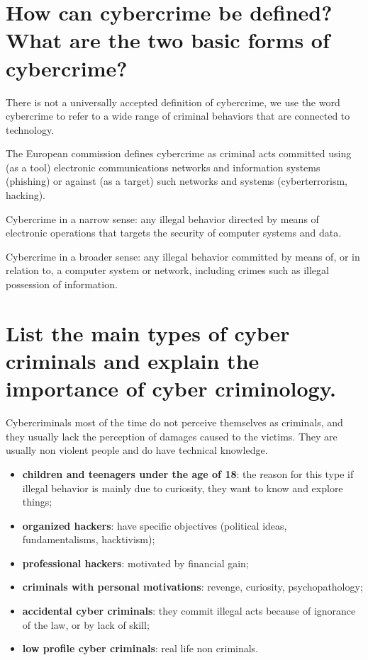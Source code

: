 \documentclass[a4paper, 11pt]{article}
\begin{document}
\section{How can cybercrime be defined? What are the two basic forms of cybercrime?}
There is not a universally accepted definition of cybercrime, we use the word cybercrime to refer to a wide range of criminal behaviors that are connected to technology.

The European commission defines cybercrime as criminal acts committed using (as a tool) electronic communications networks and information systems (phishing) or against (as a target) such networks and systems (cyberterrorism, hacking).

Cybercrime in a narrow sense: any illegal behavior directed by means of electronic operations that targets the security of computer systems and data.

Cybercrime in a broader sense: any illegal behavior committed by means of, or in relation to, a computer system or network, including crimes such as illegal possession of information.

\section{List the main types of cyber criminals and explain the importance of cyber criminology.}
Cybercriminals most of the time do not perceive themselves as criminals, and they usually lack the perception of damages caused to the victims. They are usually non violent people and do have technical knowledge.

\begin{itemize}
	\item \textbf{children and teenagers under the age of 18}: the reason for this type if illegal behavior is mainly due to curiosity, they want to know and explore things;
	\item \textbf{organized hackers}: have specific objectives (political ideas, fundamentalisms, hacktivism);
	\item \textbf{professional hackers}: motivated by financial gain;
	\item \textbf{criminals with personal motivations}: revenge, curiosity, psychopathology;
	\item \textbf{accidental cyber criminals}: they commit illegal acts because of ignorance of the law, or by lack of skill;
	\item \textbf{low profile cyber criminals}: real life non criminals.
\end{itemize}
\end{document}
